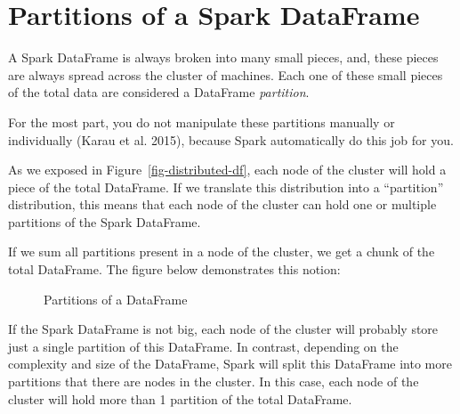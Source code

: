 \documentclass[
  11pt,
  letterpaper,
  DIV=11,
  numbers=noendperiod]{scrreprt}
\begin{document}
\section{Partitions of a Spark
DataFrame}\label{sec-dataframe-partitions}

A Spark DataFrame is always broken into many small pieces, and, these
pieces are always spread across the cluster of machines. Each one of
these small pieces of the total data are considered a DataFrame
\emph{partition}.

For the most part, you do not manipulate these partitions manually or
individually (Karau et al. 2015), because Spark automatically do this
job for you.

As we exposed in Figure~\ref{fig-distributed-df}, each node of the
cluster will hold a piece of the total DataFrame. If we translate this
distribution into a ``partition'' distribution, this means that each
node of the cluster can hold one or multiple partitions of the Spark
DataFrame.

If we sum all partitions present in a node of the cluster, we get a
chunk of the total DataFrame. The figure below demonstrates this notion:

\begin{figure}


\caption{\label{fig-partitions-df}Partitions of a DataFrame}

\end{figure}%

If the Spark DataFrame is not big, each node of the cluster will
probably store just a single partition of this DataFrame. In contrast,
depending on the complexity and size of the DataFrame, Spark will split
this DataFrame into more partitions that there are nodes in the cluster.
In this case, each node of the cluster will hold more than 1 partition
of the total DataFrame.
\end{document}

